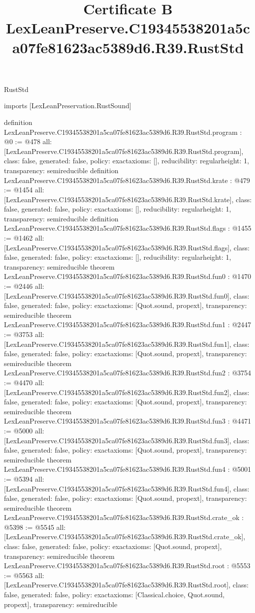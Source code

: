 \begin{lexlean}{RustStd}
\title{Certificate B LexLeanPreserve.C19345538201a5ca07fe81623ac5389d6.R39.RustStd}
\begin{coremodule}
imports [LexLeanPreservation.RustSound]

definition LexLeanPreserve.C19345538201a5ca07fe81623ac5389d6.R39.RustStd.program : @0 := @478 {
  all: [LexLeanPreserve.C19345538201a5ca07fe81623ac5389d6.R39.RustStd.program],
  class: false,
  generated: false,
  policy: exact{axioms: []},
  reducibility: regular{height: 1},
  transparency: semireducible
}
definition LexLeanPreserve.C19345538201a5ca07fe81623ac5389d6.R39.RustStd.krate : @479 := @1454 {
  all: [LexLeanPreserve.C19345538201a5ca07fe81623ac5389d6.R39.RustStd.krate],
  class: false,
  generated: false,
  policy: exact{axioms: []},
  reducibility: regular{height: 1},
  transparency: semireducible
}
definition LexLeanPreserve.C19345538201a5ca07fe81623ac5389d6.R39.RustStd.flags : @1455 := @1462 {
  all: [LexLeanPreserve.C19345538201a5ca07fe81623ac5389d6.R39.RustStd.flags],
  class: false,
  generated: false,
  policy: exact{axioms: []},
  reducibility: regular{height: 1},
  transparency: semireducible
}
theorem LexLeanPreserve.C19345538201a5ca07fe81623ac5389d6.R39.RustStd.fun0 : @1470 := @2446 {
  all: [LexLeanPreserve.C19345538201a5ca07fe81623ac5389d6.R39.RustStd.fun0],
  class: false,
  generated: false,
  policy: exact{axioms: [Quot.sound, propext]},
  transparency: semireducible
}
theorem LexLeanPreserve.C19345538201a5ca07fe81623ac5389d6.R39.RustStd.fun1 : @2447 := @3753 {
  all: [LexLeanPreserve.C19345538201a5ca07fe81623ac5389d6.R39.RustStd.fun1],
  class: false,
  generated: false,
  policy: exact{axioms: [Quot.sound, propext]},
  transparency: semireducible
}
theorem LexLeanPreserve.C19345538201a5ca07fe81623ac5389d6.R39.RustStd.fun2 : @3754 := @4470 {
  all: [LexLeanPreserve.C19345538201a5ca07fe81623ac5389d6.R39.RustStd.fun2],
  class: false,
  generated: false,
  policy: exact{axioms: [Quot.sound, propext]},
  transparency: semireducible
}
theorem LexLeanPreserve.C19345538201a5ca07fe81623ac5389d6.R39.RustStd.fun3 : @4471 := @5000 {
  all: [LexLeanPreserve.C19345538201a5ca07fe81623ac5389d6.R39.RustStd.fun3],
  class: false,
  generated: false,
  policy: exact{axioms: [Quot.sound, propext]},
  transparency: semireducible
}
theorem LexLeanPreserve.C19345538201a5ca07fe81623ac5389d6.R39.RustStd.fun4 : @5001 := @5394 {
  all: [LexLeanPreserve.C19345538201a5ca07fe81623ac5389d6.R39.RustStd.fun4],
  class: false,
  generated: false,
  policy: exact{axioms: [Quot.sound, propext]},
  transparency: semireducible
}
theorem LexLeanPreserve.C19345538201a5ca07fe81623ac5389d6.R39.RustStd.crate_ok : @5398 := @5545 {
  all: [LexLeanPreserve.C19345538201a5ca07fe81623ac5389d6.R39.RustStd.crate_ok],
  class: false,
  generated: false,
  policy: exact{axioms: [Quot.sound, propext]},
  transparency: semireducible
}
theorem LexLeanPreserve.C19345538201a5ca07fe81623ac5389d6.R39.RustStd.root : @5553 := @5563 {
  all: [LexLeanPreserve.C19345538201a5ca07fe81623ac5389d6.R39.RustStd.root],
  class: false,
  generated: false,
  policy: exact{axioms: [Classical.choice, Quot.sound, propext]},
  transparency: semireducible
}


\end{coremodule}
\end{lexlean}
